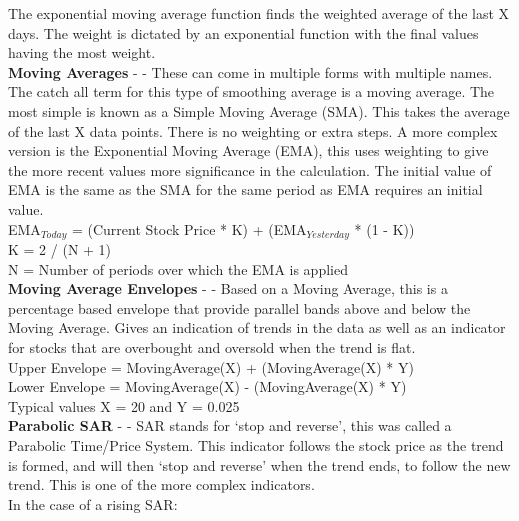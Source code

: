 \documentclass[conference]{IEEEtran}
\begin{document}
The exponential moving average function finds the weighted average of the last X days. The weight is dictated by an exponential function with the final values having the most weight.\\

\noindent
\textbf{Moving Averages} - \cite{Murphy1999} - These can come in multiple forms with multiple names. The catch all term for this type of smoothing average is a moving average. The most simple is known as a Simple Moving Average (SMA). This takes the average of the last X data points. There is no weighting or extra steps. A more complex version is the Exponential Moving Average (EMA), this uses weighting to give the more recent values more significance in the calculation. The initial value of EMA is the same as the SMA for the same period as EMA requires an initial value.\\

\noindent
EMA$_{Today}$ = (Current Stock Price * K) + (EMA$_{Yesterday}$ * (1 - K)) \\
K = 2 / (N + 1) \\
N = Number of periods over which the EMA is applied \\

\noindent
\textbf{Moving Average Envelopes} - \cite{Murphy1999} - Based on a Moving Average, this is a percentage based envelope that provide parallel bands above and below the Moving Average. Gives an indication of trends in the data as well as an indicator for stocks that are overbought and oversold when the trend is flat.\\

\noindent
Upper Envelope = MovingAverage(X) + (MovingAverage(X) * Y)\\
Lower Envelope = MovingAverage(X) - (MovingAverage(X) * Y)\\
Typical values X = 20 and Y = 0.025\\

\noindent
\textbf{Parabolic SAR} - \cite{Wilder1978} - SAR stands for `stop and reverse', this was called a Parabolic Time/Price System. This indicator follows the stock price as the trend is formed, and will then `stop and reverse' when the trend ends, to follow the new trend. This is one of the more complex indicators.\\

\noindent
In the case of a rising SAR:
\end{document}
